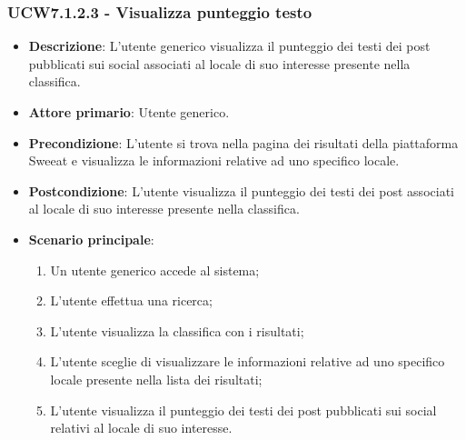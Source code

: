 \subsubsection{UCW7.1.2.3 - Visualizza punteggio testo}
\begin{itemize}
	\item \textbf{Descrizione}: L'utente generico visualizza il punteggio dei testi dei post pubblicati sui social associati al locale di suo interesse presente nella classifica.
    \item \textbf{Attore primario}: Utente generico.
    \item \textbf{Precondizione}: L’utente si trova nella pagina dei risultati della piattaforma Sweeat e visualizza le informazioni relative ad uno specifico locale.
    \item \textbf{Postcondizione}: L’utente visualizza il punteggio dei testi dei post associati al locale di suo interesse presente nella classifica.
    \item \textbf{Scenario principale}: 
    \begin{enumerate}
        \item Un utente generico accede al sistema;
        \item L’utente effettua una ricerca;
        \item L'utente visualizza la classifica con i risultati;
        \item L'utente sceglie di visualizzare le informazioni relative ad uno specifico locale presente nella lista dei risultati;
        \item L'utente visualizza il punteggio dei testi dei post pubblicati sui social relativi al locale di suo interesse.
    \end{enumerate}
\end{itemize}

